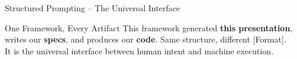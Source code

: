 \begin{frame}{Structured Prompting -- The Universal Interface}
  \vspace{-0.1cm}

  \begin{block}{\small One Framework, Every Artifact}
    \scriptsize
    This framework generated \textbf{this presentation}, writes our \textbf{specs},
    and produces our \textbf{code}. Same structure, different [Format].\\
    It is the universal interface between human intent and machine execution.
  \end{block}
\end{frame}
